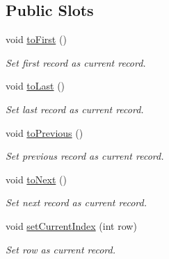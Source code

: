 \subsection*{Public Slots}
\begin{DoxyCompactItemize}
\item 
\hypertarget{classmdt_sql_form_widget_a4bb7ddf419e845de2d1a7c1ef95e48a8}{
void \hyperlink{classmdt_sql_form_widget_a4bb7ddf419e845de2d1a7c1ef95e48a8}{toFirst} ()}
\label{classmdt_sql_form_widget_a4bb7ddf419e845de2d1a7c1ef95e48a8}

\begin{DoxyCompactList}\small\item\em Set first record as current record. \end{DoxyCompactList}\item 
\hypertarget{classmdt_sql_form_widget_aefbaa029ac6141ab3d12da2a27d30dda}{
void \hyperlink{classmdt_sql_form_widget_aefbaa029ac6141ab3d12da2a27d30dda}{toLast} ()}
\label{classmdt_sql_form_widget_aefbaa029ac6141ab3d12da2a27d30dda}

\begin{DoxyCompactList}\small\item\em Set last record as current record. \end{DoxyCompactList}\item 
\hypertarget{classmdt_sql_form_widget_a7dc4bc0b63b10d420f7ab04a43e4f371}{
void \hyperlink{classmdt_sql_form_widget_a7dc4bc0b63b10d420f7ab04a43e4f371}{toPrevious} ()}
\label{classmdt_sql_form_widget_a7dc4bc0b63b10d420f7ab04a43e4f371}

\begin{DoxyCompactList}\small\item\em Set previous record as current record. \end{DoxyCompactList}\item 
\hypertarget{classmdt_sql_form_widget_a49496a848e015ed8335a2bfd33906000}{
void \hyperlink{classmdt_sql_form_widget_a49496a848e015ed8335a2bfd33906000}{toNext} ()}
\label{classmdt_sql_form_widget_a49496a848e015ed8335a2bfd33906000}

\begin{DoxyCompactList}\small\item\em Set next record as current record. \end{DoxyCompactList}\item 
\hypertarget{classmdt_sql_form_widget_a982e8e8347ec4f98bf3df6980997a2db}{
void \hyperlink{classmdt_sql_form_widget_a982e8e8347ec4f98bf3df6980997a2db}{setCurrentIndex} (int row)}
\label{classmdt_sql_form_widget_a982e8e8347ec4f98bf3df6980997a2db}

\begin{DoxyCompactList}\small\item\em Set row as current record. \end{DoxyCompactList}\end{DoxyCompactItemize}
